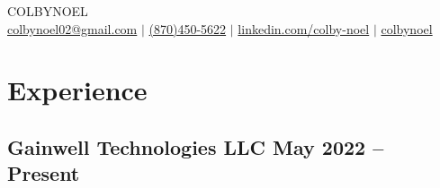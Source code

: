 \documentclass[10pt]{article}
\begin{document}
\begin{center}
    {\fontsize{30}{30}\selectfont\interthin COLBY\interheavy NOEL} \\ \bigskip
    {\color{icnclr}\faEnvelope[regular]} \href{mailto:colbynoel02@gmail.com}{colbynoel02@gmail.com} 
    $|$ 
    {\color{icnclr}} \href{tel:8704505622}{(870)450-5622}
    $|$ 
    {\color{icnclr}\faLinkedinIn} \href{https://www.linkedin.com/in/colby-noel-a56365208/}{linkedin.com/colby-noel} 
    $|$ 
    {\color{icnclr}\faGithub} \href{https://github.com/colbynoel}{colbynoel}
\end{center}

\section{Experience}
\subsection{Gainwell Technologies LLC \hfill May 2022 -- Present}
\end{document}
